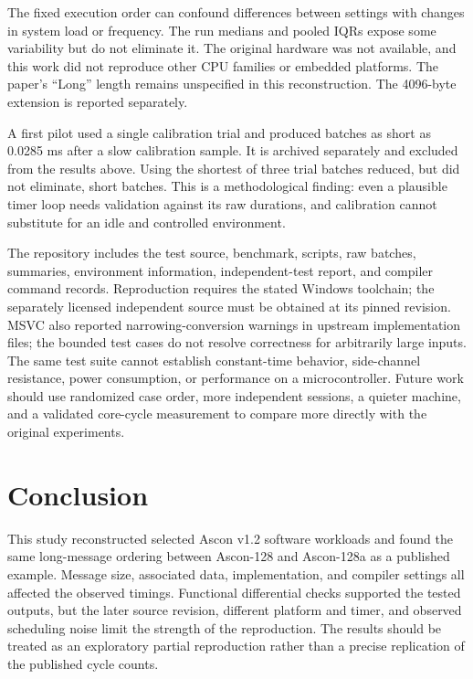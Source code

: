 \documentclass[conference]{IEEEtran}
\begin{document}
The fixed execution order can confound differences between settings with
changes in system load or frequency. The run medians and pooled IQRs expose
some variability but do not eliminate it. The original hardware was not
available, and this work did not reproduce other CPU families or embedded
platforms. The paper's ``Long'' length remains unspecified in this
reconstruction. The 4096-byte extension is reported separately.

A first pilot used a single calibration trial and produced batches as short
as 0.0285 ms after a slow calibration sample. It is archived separately and
excluded from the results above. Using the shortest of three trial batches
reduced, but did not eliminate, short batches. This is a methodological
finding: even a plausible timer loop needs validation against its raw
durations, and calibration cannot substitute for an idle and controlled
environment.

The repository includes the test source, benchmark, scripts, raw batches,
summaries, environment information, independent-test report, and compiler
command records. Reproduction requires the stated Windows toolchain; the
separately licensed independent source must be obtained at its pinned
revision. MSVC also reported narrowing-conversion warnings in upstream
implementation files; the bounded test cases do not resolve correctness for
arbitrarily large inputs. The same test suite cannot establish constant-time behavior,
side-channel resistance, power consumption, or performance on a microcontroller.
Future work should use randomized case order, more independent sessions, a
quieter machine, and a validated core-cycle measurement to compare more
directly with the original experiments.

\section{Conclusion}
This study reconstructed selected Ascon v1.2 software workloads and found
the same long-message ordering between Ascon-128 and Ascon-128a as a published
example. Message size, associated data, implementation, and compiler settings
all affected the observed timings. Functional differential checks supported
the tested outputs, but the later source revision, different platform and
timer, and observed scheduling noise limit the strength of the reproduction.
The results should be treated as an exploratory partial reproduction rather
than a precise replication of the published cycle counts.



\end{document}

